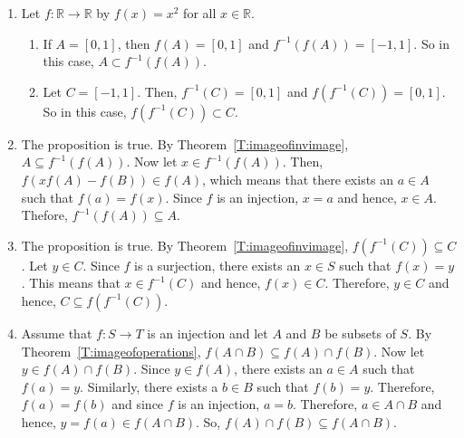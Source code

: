 \begin{enumerate}
\begin{multicols}{4}
$B = \left\{ 2, 3 \right\}$
\end{multicols}
$f: S \to T$ by $f \left( 1 \right) = a$, $f \left( 2 \right) = a$, $f \left( 3 \right) = b$.

Then,

$f \left( A \right) \cap f \left( B \right) = \left\{ a \right\}$ and 
$f \left( Af \left( A \right) \cap f \left( B \right) \cap B \right) = \emptyset$.

\item Let $f: \mathbb{R} \to \mathbb{R}$ by $f \left( x \right) = x^2$ for all 
$x \in \mathbb{R}$.  
\begin{enumerate}
\item If $A = \left[ 0, 1 \right]$, then 
$f \left( A \right) = \left[ 0, 1 \right]$ and 
$f^{-1} \left( f \left( A \right) \right) = \left[ -1, 1 \right]$.  So in this case, 
$A \subset f^{-1} \left( f \left( A \right) \right)$.

\item Let $C = \left[ - 1, 1 \right]$.  Then, $f^{-1} \left( C \right) = \left[ 0, 1 \right]$ and 
$f \left( f^{-1} \left( C \right) \right) = \left[ 0, 1 \right]$.  So in this case, 
$f \left( f^{-1} \left( C \right) \right) \subset C$.
\end{enumerate}

\item The proposition is true.  By Theorem~\ref{T:imageofinvimage}, 
$A \subseteq f^{-1} \left( f \left( A \right) \right)$.  Now let 
$x \in f^{-1} \left( f \left( A \right) \right)$.  Then, 
$f \left( xf \left( A \right) - f \left( B \right) \right) \in f \left( A \right)$, which means that there exists an $a \in A$ such that 
$f \left( a \right) = f \left( x \right)$.  Since $f$ is an injection, $x = a$ and hence, 
$x \in A$.  Thefore, $f^{-1} \left( f \left( A \right) \right) \subseteq A$.

\item The proposition is true.  By Theorem~\ref{T:imageofinvimage},
$f \left( f^{-1} \left( C \right) \right) \subseteq C$.  Let $y \in C$.  Since $f$ is a surjection, there exists an $x \in S$ such that $f \left( x \right) = y$.  This means that 
$x \in f^{-1} \left( C \right)$ and hence, $f \left( x \right) \in C$.  Therefore, 
$y \in C$ and hence, $C \subseteq f \left( f^{-1} \left( C \right) \right)$.

\item Assume that $f : S \to T$ is an injection and let $A$ and $B$ be subsets of $S$.  By 
Theorem~\ref{T:imageofoperations}, 
$f \left( A \cap B \right) \subseteq f \left( A \right) \cap f \left( B \right)$.  Now let 
$y \in f \left( A \right) \cap f \left( B \right)$.  Since $y \in f \left( A \right)$, there exists an $a \in A$ such that $f \left( a \right) = y$.  Similarly, there exists a $b \in B$ such that $f \left( b \right) = y$.  Therefore, $f \left( a \right) = f \left( b \right)$ and since 
$f$ is an injection, $a = b$.  Therefore, $a \in A \cap B$ and hence, 
$y = f \left( a \right) \in f \left( A \cap B \right)$.  So, 
$f \left( A \right) \cap f \left( B \right) \subseteq f \left( A \cap B \right)$.


\end{enumerate}
